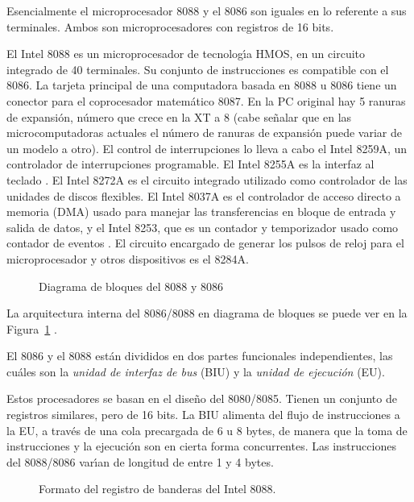 Esencialmente el microprocesador 8088 y el 8086 son iguales en lo re\-fe\-ren\-te a sus %
terminales. Ambos son microprocesadores con registros de 16 bits.

El Intel 8088 es un microprocesador de tecnolog\'{\i}a HMOS, en un circuito integrado de 40 %
terminales. Su conjunto de instrucciones es compatible con el 8086. La tarjeta principal de una %
computadora basada en 8088 u 8086 tiene un conector para el coprocesador matem\'atico 8087. En %
la PC original hay 5 ranuras de expansi\'on, n\'umero que crece en la XT a 8 (cabe se\~nalar %
que en las microcomputadoras actuales el n\'umero de ranuras de expansi\'on puede variar de un %
modelo a otro). El control de interrupciones lo lleva a cabo el Intel 8259A, un controlador de %
interrupciones programable. El Intel 8255A es la interfaz al teclado \cite{Godfrey}. El Intel %
8272A es el circuito integrado utilizado como controlador de las unidades de discos flexibles. %
El Intel 8037A es el controlador de acceso directo a memoria (DMA) usado para manejar las %
transferencias en bloque de entrada y salida de datos, y el Intel 8253, que es un contador y %
temporizador usado como contador de eventos \cite{Godfrey}. El circuito encargado de generar %
los pulsos de reloj para el microprocesador y otros dispositivos es el 8284A.

\begin{figure}[!htb]
\vskip 5mm
\vskip 100mm
\caption{Diagrama de bloques del 8088 y 8086} 
\label{Bloques}
\end{figure}

La arquitectura interna del 8086/8088 en diagrama de bloques se puede ver en la %
Figura~\ref{Bloques} \cite{Hall}.

El 8086 y el 8088 est\'an divididos en dos partes funcionales independientes, las cu\'ales son %
la {\em unidad de interfaz de bus} (BIU) y la {\em unidad de ejecuci\'on} (EU).

Estos procesadores se basan en el dise\~no del 8080/8085. Tienen un conjunto de registros %
similares, pero de 16 bits. La BIU alimenta del flujo de instrucciones a la EU, a trav\'es de %
una cola precargada de 6 u 8 bytes, de manera que la toma de instrucciones y la ejecuci\'on son %
en cierta forma concurrentes. Las instrucciones del 8088/8086 var\'{\i}an de longitud de entre %
1 y 4 bytes.

\begin{figure}[!htb]
\vskip 5mm
\vskip 100mm
\caption{Formato del registro de banderas del Intel 8088.} 
\label{Fig:flags}
\end{figure}


